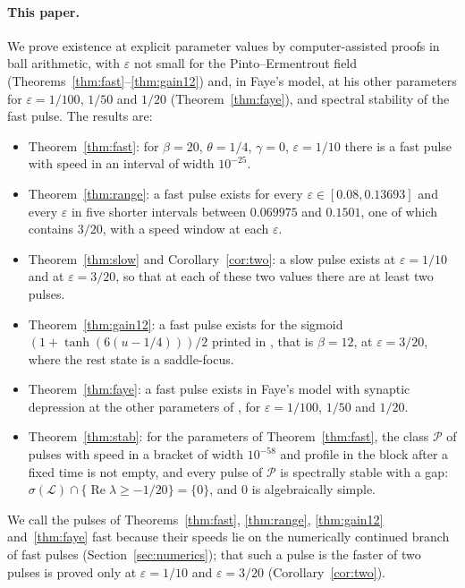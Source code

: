 \documentclass[11pt]{article}
\theoremstyle{definition}
\newcommand{\eps}{\varepsilon}
\newcommand{\re}{\operatorname{Re}}
\newcommand{\Lop}{\mathcal{L}}
\newcommand{\Pcl}{\mathcal{P}}
\begin{document}
\paragraph{This paper.} We prove existence at explicit parameter values by computer-assisted proofs in ball arithmetic, with $\eps$ not small for the Pinto--Ermentrout field (Theorems~\ref{thm:fast}--\ref{thm:gain12}) and, in Faye's model, at his other parameters for $\eps = 1/100$, $1/50$ and $1/20$ (Theorem~\ref{thm:faye}), and spectral stability of the fast pulse. The results are:
\begin{itemize}
\item Theorem~\ref{thm:fast}: for $\beta = 20$, $\theta = 1/4$, $\gamma = 0$, $\eps = 1/10$ there is a fast pulse with speed in an interval of width $10^{-25}$.
\item Theorem~\ref{thm:range}: a fast pulse exists for every $\eps \in [0.08, 0.13693]$ and every $\eps$ in five shorter intervals between $0.069975$ and $0.1501$, one of which contains $3/20$, with a speed window at each $\eps$.
\item Theorem~\ref{thm:slow} and Corollary~\ref{cor:two}: a slow pulse exists at $\eps = 1/10$ and at $\eps = 3/20$, so that at each of these two values there are at least two pulses.
\item Theorem~\ref{thm:gain12}: a fast pulse exists for the sigmoid $(1 + \tanh(6(u - 1/4)))/2$ printed in \cite[Fig.~5]{pe2001}, that is $\beta = 12$, at $\eps = 3/20$, where the rest state is a saddle-focus.
\item Theorem~\ref{thm:faye}: a fast pulse exists in Faye's model with synaptic depression at the other parameters of \cite{faye2013}, for $\eps = 1/100$, $1/50$ and $1/20$.
\item Theorem~\ref{thm:stab}: for the parameters of Theorem~\ref{thm:fast}, the class $\Pcl$ of pulses with speed in a bracket of width $10^{-58}$ and profile in the block after a fixed time is not empty, and every pulse of $\Pcl$ is spectrally stable with a gap: $\sigma(\Lop) \cap \{\re\lambda \ge -1/20\} = \{0\}$, and $0$ is algebraically simple.
\end{itemize}
We call the pulses of Theorems~\ref{thm:fast}, \ref{thm:range}, \ref{thm:gain12} and~\ref{thm:faye} fast because their speeds lie on the numerically continued branch of fast pulses (Section~\ref{sec:numerics}); that such a pulse is the faster of two pulses is proved only at $\eps = 1/10$ and $\eps = 3/20$ (Corollary~\ref{cor:two}).
\end{document}
